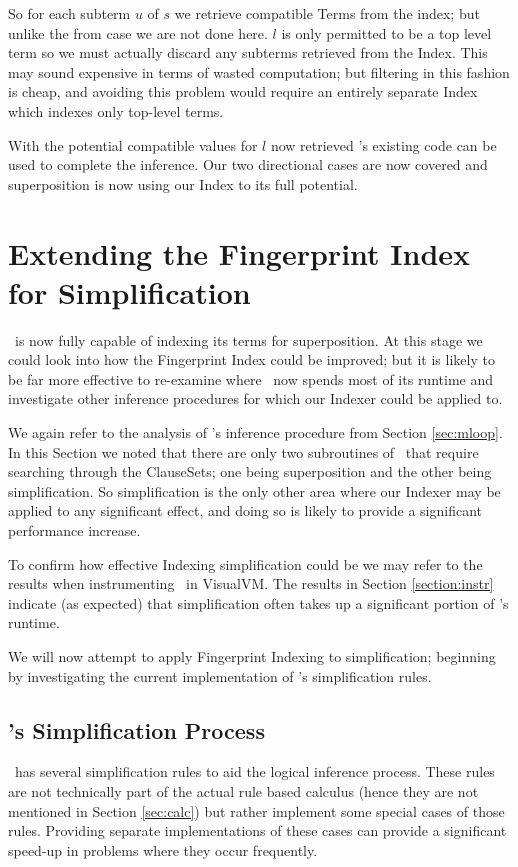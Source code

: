 So for each subterm $u$ of $s$ we retrieve compatible Terms from the index; but
unlike the from case we are not done here. $l$ is only permitted to be a top level term
so we must actually discard any subterms retrieved from the Index. This may sound expensive in terms
of wasted computation; but filtering in this fashion is cheap, and avoiding this
problem would require an entirely separate Index which indexes only top-level terms.
 
With the potential compatible values for $l$ now retrieved \beagle's existing code
can be used to complete the inference. Our two directional cases are now
covered and superposition is now using our Index to its full potential.

\section{Extending the Fingerprint Index for Simplification}
\label{sec:simp}

\Beagle\ is now fully capable of indexing its terms for superposition. At this stage
we could look into how the Fingerprint Index could be improved; but it is likely
to be far more effective to re-examine where \beagle\ now spends most of its runtime
and investigate other inference procedures for which our Indexer could be applied to. 

We again refer to the analysis of \beagle's inference procedure from Section \ref{sec:mloop}.
In this Section we noted that there are only two subroutines of \beagle\ that require
searching through the ClauseSets; one being superposition and the other being simplification.
So simplification is the only other area where our Indexer may be applied to
any significant effect, and doing so is likely to provide a significant performance
increase.

To confirm how effective Indexing simplification could be we may refer to the results when
instrumenting \beagle\ in VisualVM. The results in Section \ref{section:instr}
indicate (as expected) that simplification often takes up a significant portion
of \beagle's runtime.

We will now attempt to apply Fingerprint Indexing to simplification; beginning
by investigating the current implementation of \beagle's simplification rules. 

\subsection{\Beagle's Simplification Process}
\label{sec:simprules}
\Beagle\ has several simplification rules to aid the logical inference process.
These rules are not technically part of the actual rule based calculus
(hence they are not mentioned in Section \ref{sec:calc}) but rather
implement some special cases of those rules. Providing separate implementations
of these cases can provide a significant speed-up in problems where they occur
frequently.

